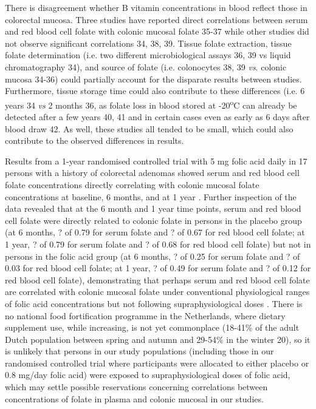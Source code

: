 \noindent There is disagreement whether B vitamin concentrations in blood reflect those in colorectal mucosa. Three studies have reported direct correlations between serum and red blood cell folate with colonic mucosal folate 35-37 while other studies did not observe significant correlations 34, 38, 39. Tissue folate extraction, tissue folate determination (i.e. two different microbiological assays 36, 39 vs liquid chromatography 34), and source of folate (i.e. colonocytes 38, 39 \emph{vs}. colonic mucosa 34-36) could partially account for the disparate results between studies. Furthermore, tissue storage time could also contribute to these differences (i.e. 6 years 34 \emph{vs} 2 months 36, as folate loss in blood stored at -20\textsuperscript{o}C can already be detected after a few years 40, 41 and in certain cases even as early as 6 days after blood draw 42. As well, these studies all tended to be small, which could also contribute to the observed differences in results. 
 
\noindent Results from a 1-year randomised controlled trial with 5 mg folic acid daily in 17 persons with a history of colorectal adenomas showed serum and red blood cell folate concentrations directly correlating with colonic mucosal folate concentrations at baseline, 6 months, and at 1 year \cite{c735}. Further inspection of the data revealed that at the 6 month and 1 year time points, serum and red blood cell folate were directly related to colonic folate in persons in the placebo group (at 6 months, ? of 0.79 for serum folate and ? of 0.67 for red blood cell folate; at 1 year, ? of 0.79 for serum folate and ? of 0.68 for red blood cell folate) but not in persons in the folic acid group (at 6 months, ? of 0.25 for serum folate and ? of 0.03 for red blood cell folate; at 1 year, ? of 0.49 for serum folate and ? of 0.12 for red blood cell folate), demonstrating that perhaps serum and red blood cell folate are correlated with colonic mucosal folate under conventional physiological ranges of folic acid 
concentrations but not following supraphysiological doses \cite{c735}. There is no national food fortification programme in the Netherlands, where dietary supplement use, while increasing, is not yet commonplace (18-41\% of the adult Dutch population between spring and autumn and 29-54\% in the winter 20), so it is unlikely that persons in our study populations (including those in our randomised controlled trial where participants were allocated to either placebo or 0.8 mg/day folic acid) were exposed to supraphysiological doses of folic acid, which may settle possible reservations concerning correlations between concentrations of folate in plasma and colonic mucosal in our studies. 
 
